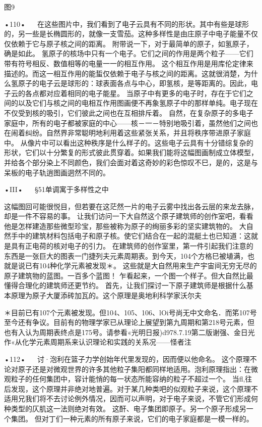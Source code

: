  

图9

•110•
  
在这些图片中，我们看到了电子云具有不同的形状。其中有些是球形的，另一些是长椭圆形的，就像一支雪茄。这种多样性是由庄原子中电子能量不仅仅依赖于它与原子核之间的距离。
附带说一下，对于最简单的原子，如氢原子，确是如此。
氢原子的核场中只有一个电子。它们之间的作用是两个粒子——它们带有符号相反、数值相等的电量一一的相互作用。
这个相互作用是用库伦定律来描述的。而这一相互作用的能蜇仅依赖于电子与核之间的距离。这就很消楚，为什么氢原子的电子云是球形的：球表面各点与中心，即氢核，是等距离的。因此，电子云的各点都对应着相同的电子能星。
当原子中有更多的电子时，存在于它们之间的以及它们与核之间的电相互作用图画便不再象氢原子中的那样单纯。电子现在不仅受到核的吸引，它们彼此之间也在互相排斥着。
自然，在复杂原子的多电子家庭中，所有的电子都被家庭的中心——核－一－特别地吸引着，虽然他们之间也在闹着纠纷。自然界非常聪明地利用着这些紧张关系，并且将秩序带进原子家庭中。
从像片中可以看出这种秩序是什么样子的。这些电子云具有十分错综复杂的形状，它们以十分繁复的形式彼此贯穿着。如果我们能将这幅图画制成立体模型，并给各个部分染上不同颜色，我们会面对着这奇妙的彩色惊叹不巳，是的，这是与呆板的电子轨逍图画迵然不同的。

•III•
  
§51单调寓于多样性之中

这幅图回可能很悦目，但若要在这茫然一片的电子云雾中找出各云层的来龙去脉，却是一件不容易的事。
让我们访问一下大自然这个原子建筑师的创作室吧，看看他是怎样建造那些微型珍宝，那些被称为原子的绚丽多彩的坚实建筑物的。
大自然手中的建筑材料包括电子和原子核。使它们结合在一起的混艇土也已知道：这就是具有正电荷的核对电子的引力。
在建筑师的创作室里，第一件引起我们注意的东西是一张巨大的图表一门捷列夫元素周期表。到今天，104个方格巳被埴满，也就是说已有104种化学元素被发现＊。
这些就是大自然用来生产宇宙间无穷无尽的原子建筑物的蓝图。一百多个蓝图！
乍看起来，一个图一个样子。但大自然比最懂得合理化的建筑师还更节约。
首先，让我们探讨一下原子建筑师是根据什么基本原理为原子大厦添砖加瓦的。这个原理是奥地利科学家沃尔夫

＊目前已有107个元素被发现。但104、105、106、lOi号尚无中文命名．而笫107号至今还有争议。目前有的物理学家已从理论上展望到第九周期和第218号元素，但也有入认为周期表终点是175号。请参看«光明日报)d978.7.19第二版谢强、金日光作«从化学元素周期系来认识理论和实践的关系况——怪者注

•112•
  
讨·泡利在篮子力学创始年代里发现的，因而便以他命名。
这个原理不论对原子还是对微观世界的许多其他粒子集阳都同样地适用。泡利原理指出：在微观粒子的任何集团中，容计能悄的每一状态所能容纳的粒子不超过一个。
当fl,往后发现，这个原理并非绝对地普遍。对于某几种类吧的似观粒子来说，这个原理不适用兄我们将不去讨论例外情况，因而可以声明，对于电子来说，不管它们形成何种类型的仄肌这一法则绝对有效。
这酐、电子集团即原子。另一个原子形成另一个集团。
但对丁们一种元素的所有原子来说，它们的电子家庭都是一模一样的。

